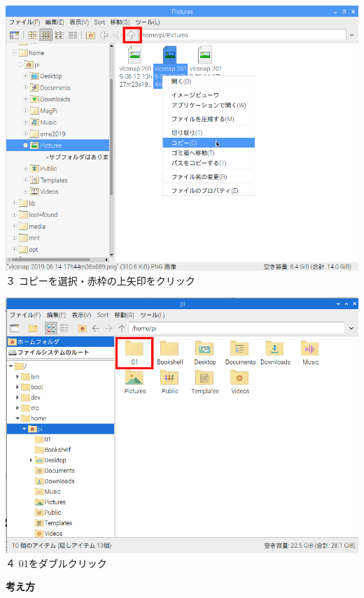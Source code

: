 \documentclass[a4paper,12pt]{jarticle}
\begin{document}
\begin{minipage}{0.45\linewidth}
  \includegraphics[width=\linewidth]{textbook-img163.png}
  \newline
  ３
  コピーを選択・赤枠の上矢印をクリック
\end{minipage}
\hspace{10mm}
\begin{minipage}{0.45\linewidth}
  \includegraphics[width=\linewidth]{textbook-img167.png}
  \newline
  ４ 01をダブルクリック
\end{minipage}

\clearpage
\flushleft

\textbf{考え方}


\bigskip
\end{document}
